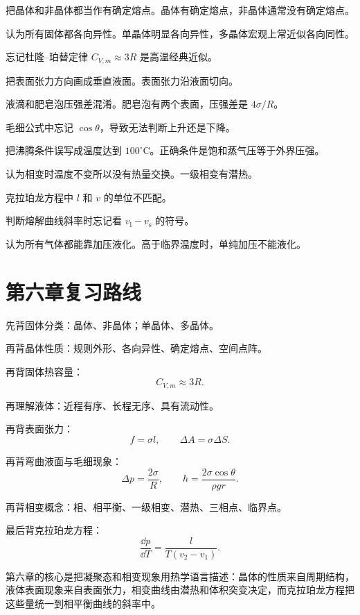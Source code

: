 \begin{WarnBox}[本章高频错误]
\begin{PitfallList}
  \item 把晶体和非晶体都当作有确定熔点。晶体有确定熔点，非晶体通常没有确定熔点。
  \item 认为所有固体都各向异性。单晶体明显各向异性，多晶体宏观上常近似各向同性。
  \item 忘记杜隆--珀替定律 \(C_{V,m}\approx3R\) 是高温经典近似。
  \item 把表面张力方向画成垂直液面。表面张力沿液面切向。
  \item 液滴和肥皂泡压强差混淆。肥皂泡有两个表面，压强差是 \(4\sigma/R\)。
  \item 毛细公式中忘记 \(\cos\theta\)，导致无法判断上升还是下降。
  \item 把沸腾条件误写成温度达到 \(100^\circ\mathrm C\)。正确条件是饱和蒸气压等于外界压强。
  \item 认为相变时温度不变所以没有热量交换。一级相变有潜热。
  \item 克拉珀龙方程中 \(l\) 和 \(v\) 的单位不匹配。
  \item 判断熔解曲线斜率时忘记看 \(v_{\mathrm l}-v_{\mathrm s}\) 的符号。
  \item 认为所有气体都能靠加压液化。高于临界温度时，单纯加压不能液化。
\end{PitfallList}
\end{WarnBox}

\section{第六章复习路线}

\begin{MethodBox}[建议背诵顺序]
\begin{ReviewList}
  \item 先背固体分类：晶体、非晶体；单晶体、多晶体。
  \item 再背晶体性质：规则外形、各向异性、确定熔点、空间点阵。
  \item 再背固体热容量：
  \[
    C_{V,m}\approx3R.
  \]
  \item 再理解液体：近程有序、长程无序、具有流动性。
  \item 再背表面张力：
  \[
    f=\sigma l,\qquad \Delta A=\sigma\Delta S.
  \]
  \item 再背弯曲液面与毛细现象：
  \[
    \Delta p=\frac{2\sigma}{R},\qquad
    h=\frac{2\sigma\cos\theta}{\rho gr}.
  \]
  \item 再背相变概念：相、相平衡、一级相变、潜热、三相点、临界点。
  \item 最后背克拉珀龙方程：
  \[
    \frac{\dd p}{\dd T}=\frac{l}{T(v_2-v_1)}.
  \]
\end{ReviewList}
\end{MethodBox}

\begin{KeyBox}[第六章一句话总结]
第六章的核心是把凝聚态和相变现象用热学语言描述：晶体的性质来自周期结构，液体表面现象来自表面张力，相变曲线由潜热和体积突变决定，而克拉珀龙方程把这些量统一到相平衡曲线的斜率中。
\end{KeyBox}